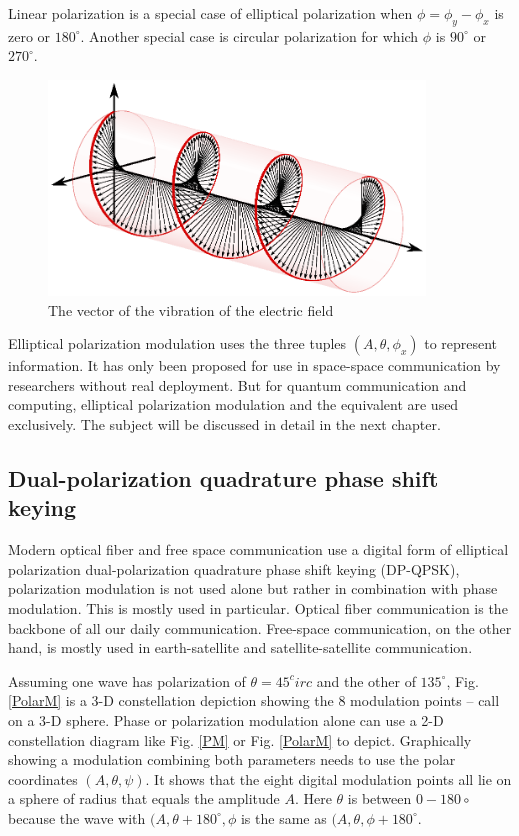 \documentclass[oneside, letter, 12pt]{book}
\begin{document}
Linear polarization is a special case of elliptical polarization when $\phi = \phi_y-\phi_x$ is zero or $180^\circ$. Another special case is circular polarization for which $\phi$ is $90^\circ$ or $270^\circ$.

\begin{figure}[h]\label{CircularP}
\includegraphics[width=10cm]{pic/CircularPolarization.eps}
\caption{The vector of the vibration of the electric field}
\end{figure}

Elliptical polarization modulation uses the three tuples $(A, \theta, \phi_x)$ to represent information. It has only been proposed for use in space-space communication by researchers\cite{Circular-Wang} without real deployment. But for quantum communication and computing, elliptical polarization modulation and the equivalent are used exclusively. The subject will be discussed in detail in the next chapter.

\subsection{Dual-polarization quadrature phase shift keying}
Modern optical fiber and free space communication use a digital form of elliptical polarization dual-polarization quadrature phase shift keying (DP-QPSK), polarization modulation is not used alone but rather in combination with phase modulation. This is mostly used in particular. Optical fiber communication is the backbone of all our daily communication. Free-space communication, on the other hand, is mostly used in earth-satellite and satellite-satellite communication.


Assuming one wave has polarization of $\theta=45^circ$ and the other of $135^\circ$, Fig. \ref{PolarM} is a 3-D constellation depiction showing the 8 modulation points -- call on a 3-D sphere. Phase or polarization modulation alone can use a 2-D constellation diagram like Fig. \ref{PM} or Fig. \ref{PolarM} to depict. Graphically showing a modulation combining both parameters needs to use the polar coordinates $(A, \theta, \psi)$. It shows that the eight digital modulation points all lie on a sphere of radius that equals the amplitude $A$. Here $\theta$ is between $0-180\circ$ because the wave with $(A, \theta+180^\circ, \phi$ is the same as $(A, \theta, \phi+180^\circ$.
\end{document}
